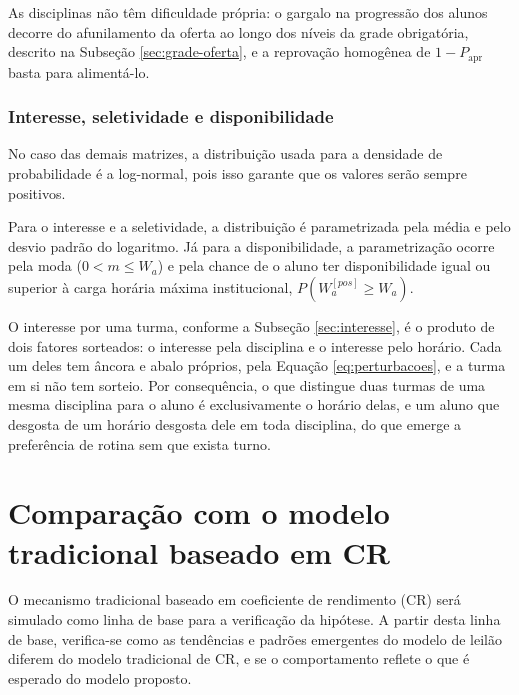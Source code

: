 \documentclass[
    12pt,
    openany,
    oneside,
    a4paper,
    english,
    brazil
]{abntex2}
\begin{document}
As disciplinas não têm dificuldade própria: o gargalo na progressão dos alunos decorre do afunilamento da oferta ao longo dos níveis da grade obrigatória, descrito na Subseção \ref{sec:grade-oferta}, e a reprovação homogênea de $1 - P_\text{apr}$ basta para alimentá-lo.

\subsubsection{Interesse, seletividade e disponibilidade}

No caso das demais matrizes, a distribuição usada para a densidade de probabilidade é a log-normal, pois isso garante que os valores serão sempre positivos.

Para o interesse e a seletividade, a distribuição é parametrizada pela média e pelo desvio padrão do logaritmo. Já para a disponibilidade, a parametrização ocorre pela moda ($0 < m \leq W_a$) e pela chance de o aluno ter disponibilidade igual ou superior à carga horária máxima institucional, $P(W^{[pos]}_a \geq W_a)$.

O interesse por uma turma, conforme a Subseção \ref{sec:interesse}, é o produto de dois fatores sorteados: o interesse pela disciplina e o interesse pelo horário. Cada um deles tem âncora e abalo próprios, pela Equação \eqref{eq:perturbacoes}, e a turma em si não tem sorteio. Por consequência, o que distingue duas turmas de uma mesma disciplina para o aluno é exclusivamente o horário delas, e um aluno que desgosta de um horário desgosta dele em toda disciplina, do que emerge a preferência de rotina sem que exista turno.


\section{Comparação com o modelo tradicional baseado em CR}


O mecanismo tradicional baseado em coeficiente de rendimento (CR) será simulado como linha de base para a verificação da hipótese. A partir desta linha de base, verifica-se como as tendências e padrões emergentes do modelo de leilão diferem do modelo tradicional de CR, e se o comportamento reflete o que é esperado do modelo proposto.
\end{document}
